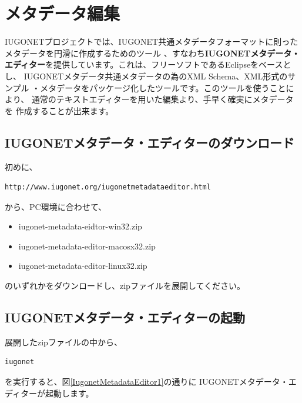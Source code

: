 \chapter{メタデータ編集}
IUGONETプロジェクトでは、IUGONET共通メタデータフォーマットに則ったメタデータを円滑に作成するためのツール
、すなわち{\bf IUGONETメタデータ・エディター}を提供しています。これは、フリーソフトであるEclipseをベースとし、
IUGONETメタデータ共通メタデータの為のXML Schema、XML形式のサンプル
・メタデータをパッケージ化したツールです。このツールを使うことにより、
通常のテキストエディターを用いた編集より、手早く確実にメタデータを
作成することが出来ます。

\section{IUGONETメタデータ・エディターのダウンロード}
初めに、
\begin{screen}
\begin{verbatim}
http://www.iugonet.org/iugonetmetadataeditor.html
\end{verbatim}
\end{screen}
から、PC環境に合わせて、
\begin{screen}
\begin{itemize}
\item iugonet-metadata-eidtor-win32.zip
\item iugonet-metadata-editor-macosx32.zip
\item iugonet-metadata-editor-linux32.zip
\end{itemize}
\end{screen}
のいずれかをダウンロードし、zipファイルを展開してください。

\section{IUGONETメタデータ・エディターの起動}
展開したzipファイルの中から、
\begin{screen}
\begin{verbatim}
iugonet
\end{verbatim}
\end{screen}
を実行すると、図\ref{IugonetMetadataEditor1}の通りに
IUGONETメタデータ・エディターが起動します。

